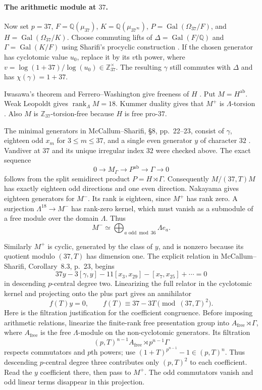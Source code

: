 \paragraph{The arithmetic module at $37$.}
Now set $p=37$, $F=\mathbb Q(\mu_{37})$, $K=\mathbb Q(\mu_{37^\infty})$, $P=\operatorname{Gal}(\Omega_{37}/F)$, and $H=\operatorname{Gal}(\Omega_{37}/K)$. Choose commuting lifts of $\Delta=\operatorname{Gal}(F/\mathbb Q)$ and $\Gamma=\operatorname{Gal}(K/F)$ using Sharifi's procyclic construction \cite[\S2, p.~3]{Sharifi2002}. If the chosen generator has cyclotomic value $u_0$, replace it by its $v$th power, where $v=\log(1+37)/\log(u_0)\in\mathbb Z_{37}^{\times}$. The resulting $\gamma$ still commutes with $\Delta$ and has $\chi(\gamma)=1+37$.

Iwasawa's theorem and Ferrero--Washington give freeness of $H$ \cite[Theorem~2, pp.~273--274]{Iwasawa1981}. Put $M=H^{\mathrm{ab}}$. Weak Leopoldt gives $\operatorname{rank}_{\Lambda}M=18$. Kummer duality gives that $M^+$ is $\Lambda$-torsion \cite[Theorems~3.3.3--3.3.4, Proposition~3.4.7]{SharifiIwasawaNotes}. Also $M$ is $\mathbb Z_{37}$-torsion-free because $H$ is free pro-$37$.

The minimal generators in McCallum--Sharifi, \S8, pp.~22--23, consist of $\gamma$, eighteen odd $x_m$ for $3\le m\le37$, and a single even generator $y$ of character $32$ \cite{McCallumSharifi2003}. Vandiver at $37$ and its unique irregular index $32$ were checked above. The exact sequence
\[
 0\longrightarrow M_{\Gamma}\longrightarrow P^{\mathrm{ab}}
   \longrightarrow\Gamma\longrightarrow0
\]
follows from the split semidirect product $P=H\rtimes\Gamma$. Consequently $M/(37,T)M$ has exactly eighteen odd directions and one even direction. Nakayama gives eighteen generators for $M^-$. Its rank is eighteen, since $M^+$ has rank zero. A surjection $\Lambda^{18}\to M^-$ has rank-zero kernel, which must vanish as a submodule of a free module over the domain $\Lambda$. Thus
\[
 M^-\simeq\bigoplus_{a\text{ odd}\bmod36}\Lambda e_a.           \tag{N.5}
\]

Similarly $M^+$ is cyclic, generated by the class of $y$, and is nonzero because its quotient modulo $(37,T)$ has dimension one. The explicit relation in McCallum--Sharifi, Corollary~8.3, p.~23, begins
\[
 37y-3[\gamma,y]-11[x_3,x_{29}]-[x_7,x_{25}]+\cdots=0
                                                                  \tag{N.6}
\]
in descending $p$-central degree two. Linearizing the full relator in the cyclotomic kernel and projecting onto the plus part gives an annihilator
\[
 f(T)y=0,\qquad f(T)\equiv37-3T\pmod{(37,T)^2}.                \tag{N.7}
\]
Here is the filtration justification for the coefficient congruence. Before imposing arithmetic relations, linearize the finite-rank free presentation group into $A_{\mathrm{free}}\rtimes\Gamma$, where $A_{\mathrm{free}}$ is the free $\Lambda$-module on the non-cyclotomic generators. Its filtration
\[
 (p,T)^{n-1}A_{\mathrm{free}}\rtimes p^{n-1}\Gamma
\]
respects commutators and $p$th powers; use
$(1+T)^{p^{n-1}}-1\in(p,T)^n$. Thus descending $p$-central degree three contributes only $(p,T)^2$ to each coefficient. Read the $y$ coefficient there, then pass to $M^+$. The odd commutators vanish and odd linear terms disappear in this projection.

